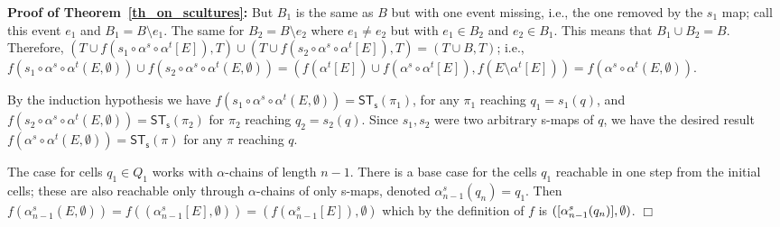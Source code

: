 \documentclass[submission,copyright,creativecommons]{eptcs}
\newenvironment{proof}[1][\!\!\,]{\vspace{1ex}\noindent\textbf{Proof #1: }}{\hfill$\Box$\vspace{2ex}}
\newcommand{\cp}[1]{}
\newcounter{case}
\newcommand\HDA{\ensuremath{\mathit{HDA}}}
\newcommand\HDAs{\ensuremath{\mathit{HDAs}}}
\newcommand\sculpintost{\ensuremath{\mathsf{ST}_{\!\mathsf{s}}}}
\newcommand\applyChainList[2]{\ensuremath{#1[#2]}}
\newcommand{\equivClass}[2][]{\ensuremath{[#2]\ifthenelse{\equal{#1}{}}{}{_{#1}}}}
\begin{document}
\begin{proof}[of Theorem~\ref{th_on_scultures}]
But $B_{1}$ is the same as $B$ but with one event missing, i.e., the one removed by the $s_{1}$ map; call this event $e_{1}$ and $B_{1}=B\setminus e_{1}$. The same for $B_{2}=B\setminus e_{2}$ where $e_{1}\neq e_{2}$ but with $e_{1}\in B_{2}$ and $e_{2}\in B_{1}$. This means that $B_{1}\cup B_{2}=B$. Therefore, $(T\cup f(\applyChainList{s_{1}\circ\alpha^{s}\circ\alpha^{t}}{E}),T)\cup(T\cup f(\applyChainList{s_{2}\circ\alpha^{s}\circ\alpha^{t}}{E}),T)=(T\cup B,T)$; i.e., $f(s_{1}\circ\alpha^{s}\circ\alpha^{t}(E,\emptyset))\cup f(s_{2}\circ\alpha^{s}\circ\alpha^{t}(E,\emptyset))=(f(\applyChainList{\alpha^{t}}{E})\cup f(\applyChainList{\alpha^{s}\circ\alpha^{t}}{E}),f(E\setminus\applyChainList{\alpha^{t}}{E}))=f(\alpha^{s}\circ\alpha^{t}(E,\emptyset))$.

By the induction hypothesis we have $f(s_{1}\circ\alpha^{s}\circ\alpha^{t}(E,\emptyset))=\sculpintost(\pi_{1})$, for any $\pi_{1}$ reaching $q_{1}=s_{1}(q)$, and $f(s_{2}\circ\alpha^{s}\circ\alpha^{t}(E,\emptyset))=\sculpintost(\pi_{2})$ for $\pi_{2}$ reaching $q_{2}=s_{2}(q)$. Since $s_{1},s_{2}$ were two arbitrary s-maps of $q$, we have the desired result $f(\alpha^{s}\circ\alpha^{t}(E,\emptyset))=\sculpintost(\pi)$ for any $\pi$ reaching $q$.

The case for cells $q_{1}\in Q_{1}$ works with $\alpha$-chains of length $n-1$.
There is a base case for the cells $q_{1}$ reachable in one step from the initial cells; these are also reachable only through $\alpha$-chains of only s-maps, denoted $\alpha_{n-1}^{s}(q_{n})=q_{1}$. Then $f(\alpha_{n-1}^{s}(E,\emptyset))=f((\applyChainList{\alpha_{n-1}^{s}}{E},\emptyset))=(f(\applyChainList{\alpha_{n-1}^{s}}{E}),\emptyset)$ which by the definition of $f$ is $(\equivClass{\alpha_{n-1}^{s}(q_{n})},\emptyset)$.
\end{proof}

\cp{
Can I give results relating the sculptures with configuration deterministic and configuration unique and configuration preserving properties on \HDAs\ as given by van Glabbeek?

Looks like the following:
\begin{enumerate}
\item All sculptures are configuration preserving.
\item All sculptures are configuration deterministic.
Are there \HDAs\ that are configuration deterministic, or configuration preserving but are not sculptures?
\item The example of the interleaving square as a \HDA\ is not configuration unique. But if we see it as a sculpture and take events as equivalence classes from the bulk then it becomes configuration unique.
\end{enumerate}

}
\end{document}
